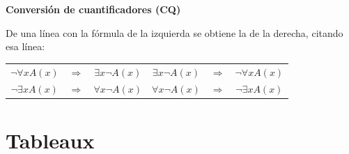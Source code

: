 \noindent\hfill
\begin{minipage}[t]{0.8\textwidth}\centering
\textbf{Conversión de cuantificadores (CQ)}\par\medskip
De una línea con la fórmula de la izquierda se obtiene la de la derecha, citando esa línea:\par\medskip
\renewcommand{\arraystretch}{1.3}
\begin{tabular}{ccc|ccc}
$\neg \forall x A(x)$ & $\Rightarrow$ & $\exists x \neg A(x)$ & $\exists x \neg A(x)$ & $\Rightarrow$ & $\neg \forall x A(x)$ \\
$\neg \exists x A(x)$ & $\Rightarrow$ & $\forall x \neg A(x)$ & $\forall x \neg A(x)$ & $\Rightarrow$ & $\neg \exists x A(x)$
\end{tabular}
\end{minipage}\hfill\mbox{}
\finfila

\clearpage
\section{Tableaux}

